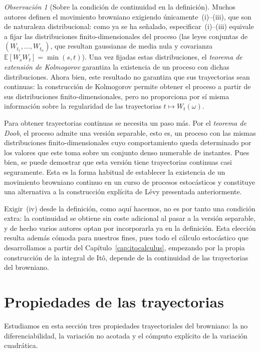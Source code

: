 \documentclass[11pt,a4paper,oneside]{report}
\theoremstyle{plain}
\theoremstyle{definition}
\theoremstyle{remark}
\newtheorem{observacion}[teorema]{Observación}
\newcommand{\E}{\mathbb{E}}
\newcommand{\1}{\mathbf{1}}
\begin{document}
\begin{observacion}[Sobre la condición de continuidad en la definición]
\label{obs:continuidad_definicion}
Muchos autores definen el movimiento browniano
exigiendo únicamente~(i)--(iii), que son de naturaleza distribucional:
como ya se ha señalado, especificar~(i)--(iii) equivale a fijar las
distribuciones finito-dimensionales del proceso (las leyes conjuntas de
$(W_{t_1}, \dots, W_{t_n})$, que resultan gaussianas de media nula y
covarianza $\E[W_s W_t] = \min(s, t)$). Una vez fijadas estas distribuciones, el \emph{teorema de extensión de Kolmogorov}
garantiza la existencia de un proceso con dichas distribuciones. Ahora bien, este resultado no garantiza que sus trayectorias sean continuas: la construcción de Kolmogorov permite obtener el proceso a partir de sus distribuciones finito-dimensionales, pero no proporciona por sí misma información sobre la regularidad de las trayectorias
$t \mapsto W_t(\omega)$.

Para obtener trayectorias continuas se necesita un paso más. Por el \emph{teorema de Doob}, el proceso admite una versión separable, esto es, un proceso con las mismas distribuciones finito-dimensionales cuyo comportamiento queda determinado por los valores que este toma sobre un conjunto denso numerable de instantes. Pues bien, se puede demostrar que esta versión tiene trayectorias continuas casi seguramente. Esta es la forma habitual de establecer la existencia de un movimiento browniano continuo en un curso de procesos estocásticos y constituye una alternativa a la construcción explícita de Lévy presentada anteriormente.

Exigir~(iv) desde la definición, como aquí hacemos, no es por tanto una
condición extra: la continuidad se obtiene sin coste adicional al
pasar a la versión separable, y de hecho varios autores optan por
incorporarla ya en la definición. Esta elección resulta además cómoda
para nuestros fines, pues todo el cálculo estocástico que desarrollamos a
partir del Capítulo~\ref{cap:itocalculus}, empezando por la propia
construcción de la integral de Itô, depende de la continuidad de las trayectorias del browniano.
\end{observacion}

\section{Propiedades de las trayectorias}
\label{sec:propiedades_brown}

Estudiamos en esta sección tres propiedades trayectoriales del
browniano: la no diferenciabilidad, la variación no acotada y el
cómputo explícito de la variación cuadrática.
\end{document}
